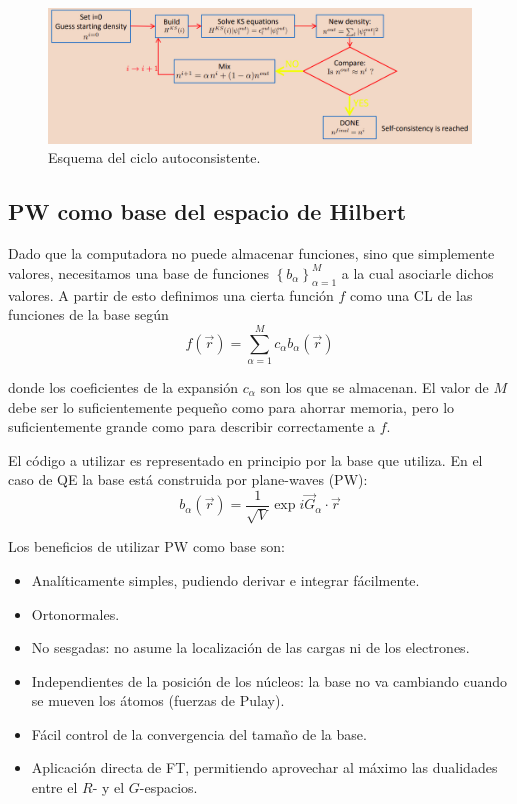   \begin{figure}[H]
      \centering
      \includegraphics[scale = 0.4]{figs/D1/SCF.png}
      \caption{Esquema del ciclo autoconsistente.}
      \label{fig:SCF}
  \end{figure}

\subsection{PW como base del espacio de Hilbert}

  Dado que la computadora no puede almacenar funciones, sino que simplemente valores, necesitamos una base de funciones $\left\{ b_{\alpha} \right\}_{\alpha=1}^M$ a la cual asociarle dichos valores. A partir de esto definimos una cierta función $f$ como una CL de las funciones de la base según
    $$f (\vec{r}) = \sum_{\alpha = 1}^M c_{\alpha} b_{\alpha} (\vec{r})$$

  donde los coeficientes de la expansión $c_{\alpha}$ son los que se almacenan. El valor de $M$ debe ser lo suficientemente pequeño como para ahorrar memoria, pero lo suficientemente grande como para describir correctamente a $f$.

  El código a utilizar es representado en principio por la base que utiliza. En el caso de QE la base está construida por plane-waves (PW):
    $$b_{\alpha} (\vec{r}) = \frac{1}{\sqrt{V}} \exp{i \vec{G}_{\alpha} \cdot \vec{r}}$$


  Los beneficios de utilizar PW como base son:
    \begin{itemize}
      \item Analíticamente simples, pudiendo derivar e integrar fácilmente.
      \item Ortonormales.
      \item No sesgadas: no asume la localización de las cargas ni de los electrones.
      \item Independientes de la posición de los núcleos: la base no va cambiando cuando se mueven los átomos (fuerzas de Pulay).
      \item Fácil control de la convergencia del tamaño de la base.
      \item Aplicación directa de FT, permitiendo aprovechar al máximo las dualidades entre el $R$- y el $G$-espacios.
    \end{itemize}

